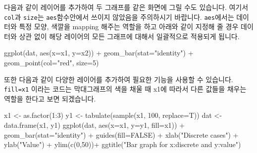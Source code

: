 \documentclass[
]{book}
\newenvironment{Shaded}{\begin{snugshade}}{\end{snugshade}}
\newcommand{\AttributeTok}[1]{\textcolor[rgb]{0.77,0.63,0.00}{#1}}
\newcommand{\ConstantTok}[1]{\textcolor[rgb]{0.00,0.00,0.00}{#1}}
\newcommand{\DecValTok}[1]{\textcolor[rgb]{0.00,0.00,0.81}{#1}}
\newcommand{\FunctionTok}[1]{\textcolor[rgb]{0.00,0.00,0.00}{#1}}
\newcommand{\NormalTok}[1]{#1}
\newcommand{\OtherTok}[1]{\textcolor[rgb]{0.56,0.35,0.01}{#1}}
\newcommand{\SpecialCharTok}[1]{\textcolor[rgb]{0.00,0.00,0.00}{#1}}
\newcommand{\StringTok}[1]{\textcolor[rgb]{0.31,0.60,0.02}{#1}}
\begin{document}
다음과 같이 레이어를 추가하여 두 그래프를 같은 화면에 그릴 수도 있습니다. 여기서 \texttt{col}과 \texttt{size}는 \texttt{aes}함수안에서 쓰이지 않았음을 주의하시기 바랍니다. \texttt{aes}에서는 데이터와 특정 모양, 색깔을 mapping 해주는 역할을 하고 아래와 같이 지정해 줄 경우 데이터와 상관 없이 해당 레이어의 모든 그래프에 대해서 일괄적으로 적용되게 됩니다.

\begin{Shaded}
\begin{Highlighting}[]
\FunctionTok{ggplot}\NormalTok{(dat, }\FunctionTok{aes}\NormalTok{(}\AttributeTok{x=}\NormalTok{x1, }\AttributeTok{y=}\NormalTok{x2)) }\SpecialCharTok{+}
  \FunctionTok{geom\_bar}\NormalTok{(}\AttributeTok{stat=}\StringTok{"identity"}\NormalTok{) }\SpecialCharTok{+}
  \FunctionTok{geom\_point}\NormalTok{(}\AttributeTok{col=}\StringTok{"red"}\NormalTok{, }\AttributeTok{size=}\DecValTok{5}\NormalTok{)}
\end{Highlighting}
\end{Shaded}

또한 다음과 같이 다양한 레이어를 추가하여 필요한 기능을 사용할 수 있습니다. \texttt{fill=x1} 이라는 코드는 막대그래프의 색을 채울 때 x1에 따라서 다른 값들을 채우는 역할을 한다고 보면 되겠습니다.

\begin{Shaded}
\begin{Highlighting}[]
\NormalTok{x1 }\OtherTok{\textless{}{-}} \FunctionTok{as.factor}\NormalTok{(}\DecValTok{1}\SpecialCharTok{:}\DecValTok{3}\NormalTok{)}
\NormalTok{y1 }\OtherTok{\textless{}{-}} \FunctionTok{tabulate}\NormalTok{(}\FunctionTok{sample}\NormalTok{(x1, }\DecValTok{100}\NormalTok{, }\AttributeTok{replace=}\NormalTok{T))}
\NormalTok{dat }\OtherTok{\textless{}{-}} \FunctionTok{data.frame}\NormalTok{(x1, y1)}
\FunctionTok{ggplot}\NormalTok{(dat, }\FunctionTok{aes}\NormalTok{(}\AttributeTok{x=}\NormalTok{x1, }\AttributeTok{y=}\NormalTok{y1, }\AttributeTok{fill=}\NormalTok{x1)) }\SpecialCharTok{+}
  \FunctionTok{geom\_bar}\NormalTok{(}\AttributeTok{stat=}\StringTok{"identity"}\NormalTok{) }\SpecialCharTok{+}
  \FunctionTok{guides}\NormalTok{(}\AttributeTok{fill=}\ConstantTok{FALSE}\NormalTok{) }\SpecialCharTok{+}
  \FunctionTok{xlab}\NormalTok{(}\StringTok{"Discrete cases"}\NormalTok{) }\SpecialCharTok{+} 
  \FunctionTok{ylab}\NormalTok{(}\StringTok{"Value"}\NormalTok{) }\SpecialCharTok{+}
  \FunctionTok{ylim}\NormalTok{(}\FunctionTok{c}\NormalTok{(}\DecValTok{0}\NormalTok{,}\DecValTok{50}\NormalTok{))}\SpecialCharTok{+}
  \FunctionTok{ggtitle}\NormalTok{(}\StringTok{"Bar graph for x:discrete and y:value"}\NormalTok{)}
\end{Highlighting}
\end{Shaded}
\end{document}
